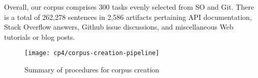 Overall, our corpus comprises 300 tasks evenly selected from SO and Git. 
There is a total of 262,278 sentences in 2,586 artifacts pertaining API documentation, Stack Overflow answers, Github issue discussions, and miscellaneous Web tutorials or blog posts. 



\begin{figure}
    \centering
    \texttt{[image: cp4/corpus-creation-pipeline]}
    \caption{Summary of procedures for corpus creation}
    \label{fig:corpus-creation-pipeline}
\end{figure}

